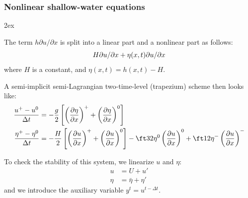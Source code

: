 \documentclass[aspectratio=149,9pt]{beamer}
\begin{document}
\begin{frame}
	\frametitle{Nonlinear shallow-water equations}
	\vspace*{-2ex}\begin{myitemize}{2ex}
		\item The  term $h\partial u/\partial x$ is split into a linear part and a nonlinear part as follows:\vspace*{-1ex}
			\begin{equation*}
				H\partial u/\partial x+\eta(x,t)\partial u/\partial x\vspace*{-1ex}
			\end{equation*}
			where $H$ is a constant, and $\eta(x,t)=h(x,t)-H$.
		\item A semi-implicit semi-Lagrangian two-time-level (trapezium) scheme then looks like:\vspace*{-1ex}
			\begin{align*}
				\frac{u^+ - u^0}{\Delta t} & = -  \frac{g}{2} \left[	\left( \frac{\partial \eta}{\partial x} \right)^+
					+ \left( \frac{\partial \eta}{\partial x} \right)^0\right]	\\
				\frac{\eta^+ - \eta^0}{\Delta t} &= - \frac{H}{2} \left[ \left( \frac{\partial u}{\partial x} \right)^+
					+ \left( \frac{\partial u}{\partial x} \right)^0 \right]
					- \ft32 \eta^0 \left( \frac{\partial u}{\partial x} \right)^0 
					+ \ft12 \eta^- \left( \frac{\partial u}{\partial x} \right)^-
			\end{align*}\vspace*{-1ex}
		\item To check the stability of this system, we linearize $u$ and $\eta$:\vspace*{-1ex}
			\begin{align*}
				u	&=U+u'	\\
				\eta&=\bar\eta+\eta'
			\end{align*}\vspace*{-1ex}
			and we introduce the auxiliary variable $y^{t}=u^{t-\Delta t}$.
	\end{myitemize}
\end{frame}
%
%
\end{document}
